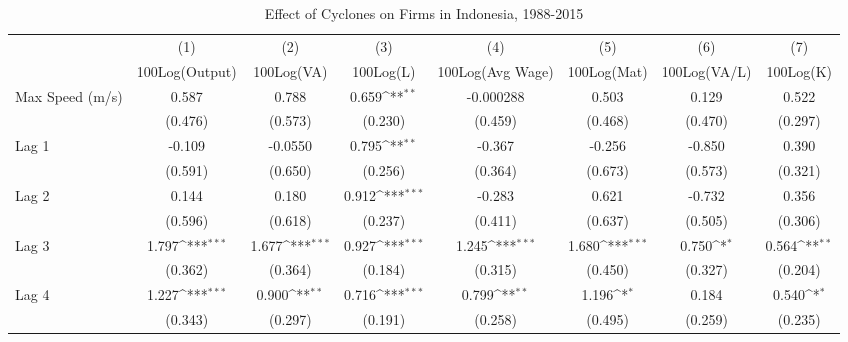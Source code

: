 \begin{table}[htbp]\centering
\def\sym#1{\ifmmode^{#1}\else\(^{#1}\)\fi}
\caption{Effect of Cyclones on Firms in Indonesia, 1988-2015}
\begin{tabular}{l*{7}{c}}
\toprule
                &\multicolumn{1}{c}{(1)}&\multicolumn{1}{c}{(2)}&\multicolumn{1}{c}{(3)}&\multicolumn{1}{c}{(4)}&\multicolumn{1}{c}{(5)}&\multicolumn{1}{c}{(6)}&\multicolumn{1}{c}{(7)}\\
                &\multicolumn{1}{c}{100Log(Output)}&\multicolumn{1}{c}{100Log(VA)}&\multicolumn{1}{c}{100Log(L)}&\multicolumn{1}{c}{100Log(Avg Wage)}&\multicolumn{1}{c}{100Log(Mat)}&\multicolumn{1}{c}{100Log(VA/L)}&\multicolumn{1}{c}{100Log(K)}\\
\midrule
Max Speed (m/s) &    0.587         &    0.788         &    0.659\sym{**} &-0.000288         &    0.503         &    0.129         &    0.522         \\
                &  (0.476)         &  (0.573)         &  (0.230)         &  (0.459)         &  (0.468)         &  (0.470)         &  (0.297)         \\
\addlinespace
Lag 1           &   -0.109         &  -0.0550         &    0.795\sym{**} &   -0.367         &   -0.256         &   -0.850         &    0.390         \\
                &  (0.591)         &  (0.650)         &  (0.256)         &  (0.364)         &  (0.673)         &  (0.573)         &  (0.321)         \\
\addlinespace
Lag 2           &    0.144         &    0.180         &    0.912\sym{***}&   -0.283         &    0.621         &   -0.732         &    0.356         \\
                &  (0.596)         &  (0.618)         &  (0.237)         &  (0.411)         &  (0.637)         &  (0.505)         &  (0.306)         \\
\addlinespace
Lag 3           &    1.797\sym{***}&    1.677\sym{***}&    0.927\sym{***}&    1.245\sym{***}&    1.680\sym{***}&    0.750\sym{*}  &    0.564\sym{**} \\
                &  (0.362)         &  (0.364)         &  (0.184)         &  (0.315)         &  (0.450)         &  (0.327)         &  (0.204)         \\
\addlinespace
Lag 4           &    1.227\sym{***}&    0.900\sym{**} &    0.716\sym{***}&    0.799\sym{**} &    1.196\sym{*}  &    0.184         &    0.540\sym{*}  \\
                &  (0.343)         &  (0.297)         &  (0.191)         &  (0.258)         &  (0.495)         &  (0.259)         &  (0.235)         \\

\end{tabular}
\end{table}

